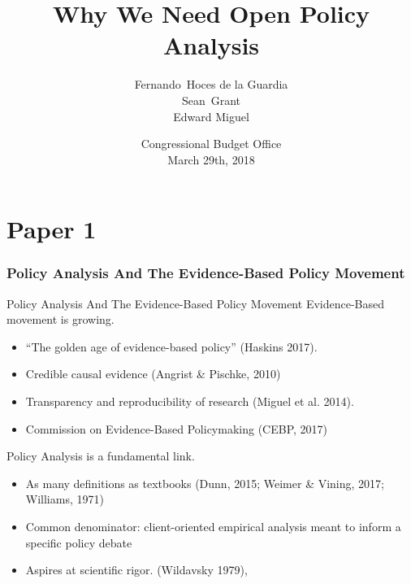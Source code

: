\documentclass{beamer}
\title[Open Policy Analysis ] %
{Why We Need Open Policy Analysis}
\subtitle
{}
\author[] %
{Fernando~Hoces de la Guardia\inst{1}\\
Sean~Grant\inst{2}\\
Edward Miguel\inst{1}}
\institute[Universities of Somewhere and Elsewhere] %
{
  \inst{1}%
  UC Berkeley:\\
  Berkeley Initiative for Transparency in the Social Sciences\\
  \inst{2}%
  RAND\\
}
\date[] %
{Congressional Budget Office\\
March 29th, 2018}
\begin{document}
\part{Paper 1}
\begin{frame}
  \titlepage
\end{frame}






 
\section[Evidence Based]{Policy Analysis And The Evidence-Based Policy Movement}

\begin{frame}{Policy Analysis And The Evidence-Based Policy Movement}
Evidence-Based movement is growing. 
\begin{itemize}
\item ``The golden age of evidence-based policy'' (Haskins 2017).
\item Credible causal evidence (Angrist \& Pischke, 2010)
\item Transparency and reproducibility of research (Miguel et al. 2014).
\item Commission on Evidence-Based Policymaking (CEBP, 2017)
\end{itemize}
\pause
Policy Analysis is a fundamental link. 
\begin{itemize}
\item As many definitions as textbooks (Dunn, 2015; Weimer \& Vining, 2017; Williams, 1971)
\item Common denominator: client-oriented empirical analysis meant to inform a specific policy debate
\item Aspires at scientific rigor. (Wildavsky 1979),
\end{itemize}
\end{frame} 
\end{document}
